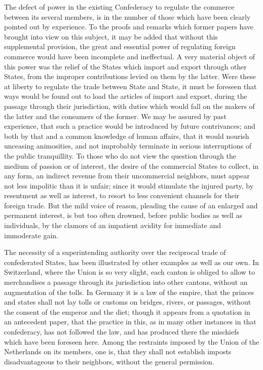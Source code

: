 The defect of power in the existing Confederacy to regulate the commerce between its several members, is in the number of those which have been clearly pointed out by experience. 
To the proofs and remarks which former papers have brought into view on this subject, it may be added that without this supplemental provision, the great and essential power of regulating foreign commerce would have been incomplete and ineffectual. 
A very material object of this power was the relief of the States which import and export through other States, from the improper contributions levied on them by the latter. 
Were these at liberty to regulate the trade between State and State, it must be foreseen that ways would be found out to load the articles of import and export, during the passage through their jurisdiction, with duties which would fall on the makers of the latter and the consumers of the former. 
We may be assured by past experience, that such a practice would be introduced by future contrivances; and both by that and a common knowledge of human affairs, that it would nourish unceasing animosities, and not improbably terminate in serious interruptions of the public tranquillity. 
To those who do not view the question through the medium of passion or of interest, the desire of the commercial States to collect, in any form, an indirect revenue from their uncommercial neighbors, must appear not less impolitic than it is unfair; since it would stimulate the injured party, by resentment as well as interest, to resort to less convenient channels for their foreign trade. 
But the mild voice of reason, pleading the cause of an enlarged and permanent interest, is but too often drowned, before public bodies as well as individuals, by the clamors of an impatient avidity for immediate and immoderate gain.

The necessity of a superintending authority over the reciprocal trade of confederated States, has been illustrated by other examples as well as our own. 
In Switzerland, where the Union is so very slight, each canton is obliged to allow to merchandises a passage through its jurisdiction into other cantons, without an augmentation of the tolls. 
In Germany it is a law of the empire, that the princes and states shall not lay tolls or customs on bridges, rivers, or passages, without the consent of the emperor and the diet; though it appears from a quotation in an antecedent paper, that the practice in this, as in many other instances in that confederacy, has not followed the law, and has produced there the mischiefs which have been foreseen here. 
Among the restraints imposed by the Union of the Netherlands on its members, one is, that they shall not establish imposts disadvantageous to their neighbors, without the general permission.

